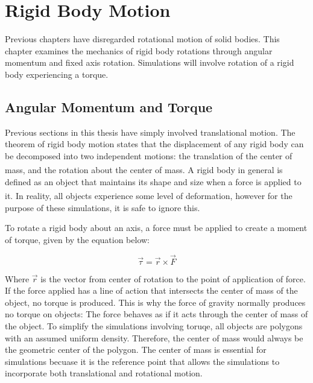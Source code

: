 
\chapter{Rigid Body Motion} %

\label{Chapter3} %



Previous chapters have disregarded rotational motion of solid bodies.  This chapter examines the mechanics of rigid body rotations through angular momentum and fixed axis rotation.  Simulations will involve rotation of a rigid body experiencing a torque.


\section{Angular Momentum and Torque}

Previous sections in this thesis have simply involved translational motion.  The theorem of rigid body motion states that the displacement of any rigid body can be decomposed into two independent motions: the translation of the center of mass, and the rotation about the center of mass.\textsuperscript{\cite{klepner}}  A rigid body in general is defined as an object that maintains its shape and size when a force is applied to it.\textsuperscript{\cite{klepner}}  In reality, all objects experience some level of deformation, however for the purpose of these simulations, it is safe to ignore this.  

To rotate a rigid body about an axis, a force must be applied to create a moment of torque, given by the equation below:

\begin{equation} \label{eq:torquegeneral}
\vec{\tau} = \vec{r} \times \vec{F}
\end{equation}


Where $\vec{r}$ is the vector from center of rotation to the point of application of force.  If the force applied has a line of action that intersects the center of mass of the object, no torque is produced.  This is why the force of gravity normally produces no torque on objects: The force behaves as if it acts through the center of mass of the object.  To simplify the simulations involving toruqe, all objects are polygons with an assumed uniform density.  Therefore, the center of mass would always be the geometric center of the polygon.  The center of mass is essential for simulations becuase it is the reference point that allows the simulations to incorporate both translational and rotational motion. 

